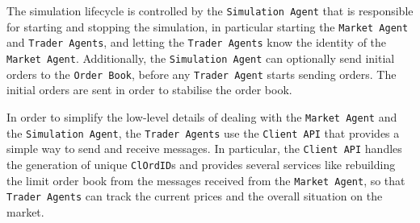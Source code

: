 The simulation lifecycle is controlled by the \texttt{Simulation Agent} that is responsible for starting and stopping the simulation, in particular starting the \texttt{Market Agent} and \texttt{Trader Agents}, and letting the \texttt{Trader Agents} know the identity of the \texttt{Market Agent}. Additionally, the \texttt{Simulation Agent} can optionally send initial orders to the \texttt{Order Book}, before any \texttt{Trader Agent} starts sending orders. The initial orders are sent in order to stabilise the order book.

In order to simplify the low-level details of dealing with the \texttt{Market Agent} and the \texttt{Simulation Agent}, the \texttt{Trader Agents} use the \texttt{Client API} that provides a simple way to send and receive messages. In particular, the \texttt{Client API} handles the generation of unique \texttt{ClOrdID}s and provides several services like rebuilding the limit order book from the messages received from the \texttt{Market Agent}, so that \texttt{Trader Agents} can track the current prices and the overall situation on the market.